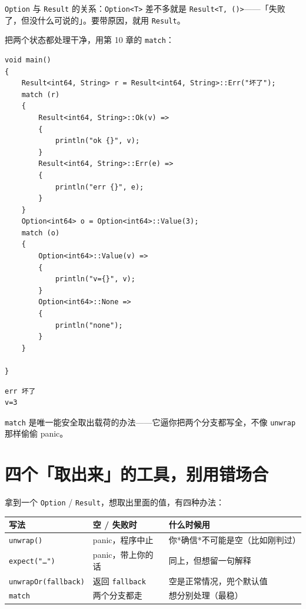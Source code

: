\texttt{Option} 与 \texttt{Result} 的关系：\texttt{Option<\allowbreak{}T>\allowbreak{}} 差不多就是 \texttt{Result<\allowbreak{}T,\allowbreak{} (\allowbreak{})\allowbreak{}>\allowbreak{}}——「失败了，但没什么可说的」。要带原因，就用 \texttt{Result}。

把两个状态都处理干净，用第 10 章的 \texttt{match}：

\par
\medskip
\begin{lstlisting}[style=chali]
void main()
{
    Result<int64, String> r = Result<int64, String>::Err("坏了");
    match (r)
    {
        Result<int64, String>::Ok(v) =>
        {
            println("ok {}", v);
        }
        Result<int64, String>::Err(e) =>
        {
            println("err {}", e);
        }
    }
    Option<int64> o = Option<int64>::Value(3);
    match (o)
    {
        Option<int64>::Value(v) =>
        {
            println("v={}", v);
        }
        Option<int64>::None =>
        {
            println("none");
        }
    }

}
\end{lstlisting}
\par
\medskip

\par
\medskip
\begin{lstlisting}[style=out]
err 坏了
v=3
\end{lstlisting}
\par
\medskip

\texttt{match} 是唯一能安全取出载荷的办法——它逼你把两个分支都写全，不像 \texttt{unwrap} 那样偷偷 panic。

\section{四个「取出来」的工具，别用错场合}

拿到一个 \texttt{Option} / \texttt{Result}，想取出里面的值，有四种办法：

\begin{center}
\begin{tabular}{lll}
\toprule
写法 & 空 / 失败时 & 什么时候用 \\
\midrule
\texttt{unwrap(\allowbreak{})\allowbreak{}} & panic，程序中止 & 你*确信*不可能是空（比如刚判过） \\
\texttt{expect(\allowbreak{}"…")\allowbreak{}} & panic，带上你的话 & 同上，但想留一句解释 \\
\texttt{unwrap\allowbreak{}Or(\allowbreak{}fallback)\allowbreak{}} & 返回 \texttt{fallback} & 空是正常情况，兜个默认值 \\
\texttt{match} & 两个分支都走 & 想分别处理（最稳） \\
\bottomrule
\end{tabular}
\end{center}

